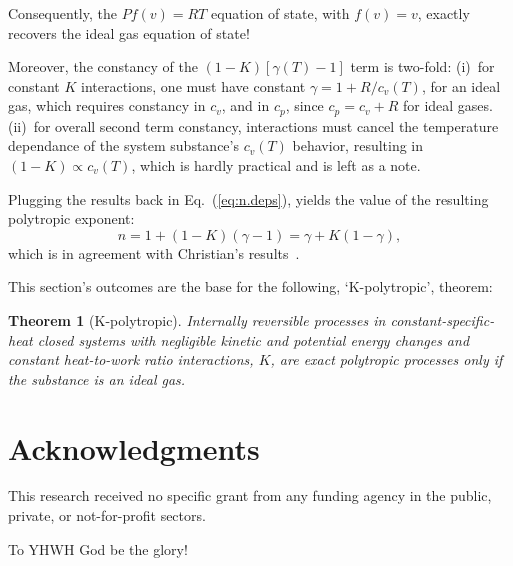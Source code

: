 \documentclass[fleqn,11pt]{SelfArx}
\newtheorem{theorem}{Theorem}
\begin{document}
    Consequently, the $Pf(v) = RT$ equation of state, with $f(v)  =  v$,  exactly  recovers  the
    ideal gas equation of state!

    Moreover, the constancy of the $(1 - K)[\gamma(T) - 1]$ term is two-fold:  (i)~for  constant
    $K$ interactions, one must have constant $\gamma = 1 + R/c_v(T)$, for an  ideal  gas,  which
    requires constancy in $c_v$, and in $c_p$, since $c_p = c_v + R$ for ideal  gases.  (ii)~for
    overall second term constancy, interactions must cancel the temperature  dependance  of  the
    system substance's $c_v(T)$ behavior, resulting in $(1 - K) \propto c_v(T)$, which is hardly
    practical and is left as a note.

    Plugging the results back in  Eq.~(\ref{eq:n.deps}),  yields  the  value  of  the  resulting
    polytropic exponent:
    \begin{equation}
        n = 1 + (1 - K)(\gamma - 1) = \gamma + K(1 - \gamma),
        \label{eq:n.final}
    \end{equation}
    \noindent        which        is        in        agreement         with         Christian's
    results~\cite{2012-ChristiansJ-IntJMechEngEduc}.

    This section's outcomes are the base for the following, `K-polytropic', theorem:

    \begin{theorem}[K-polytropic]\label{theo:K.poly}
        Internally reversible processes in constant-specific-heat closed systems with negligible
        kinetic and potential energy changes and constant heat-to-work ratio interactions,  $K$,
        are exact polytropic processes only if the substance is an ideal gas.
    \end{theorem}

\section*{Acknowledgments}

    This research received no specific grant from any funding agency in the public, private,  or
    not-for-profit sectors.

    To YHWH God be the glory!





\end{document}
